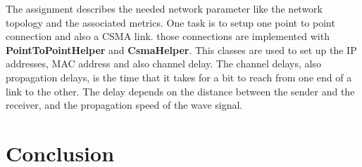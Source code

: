 \documentclass[parskip=full]{scrartcl}
\begin{document}
The assignment describes the needed network parameter like the network topology and the associated metrics. One task is to setup one point to point connection and also a CSMA link. those connections are implemented with \textbf{PointToPointHelper} and \textbf{CsmaHelper}. This classes are used to set up the IP addresses, MAC address and also channel delay. The channel delays, also propagation delays, is the time that it takes for a bit to reach from one end of a link to the other. The delay depends on the distance between the sender and the receiver, and the propagation speed of the wave signal.


\section{Conclusion}




\printbibliography
\end{document}
